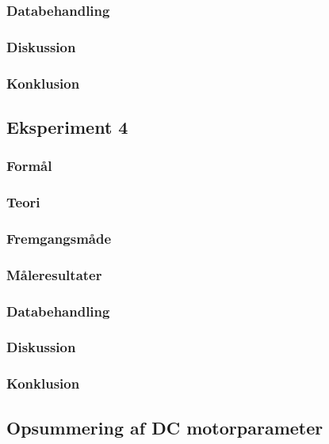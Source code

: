\subsubsection{Databehandling}
\subsubsection{Diskussion}
\subsubsection{Konklusion}


\subsection{Eksperiment 4}
\subsubsection{Formål}
\subsubsection{Teori}
\subsubsection{Fremgangsmåde}
\subsubsection{Måleresultater}
\subsubsection{Databehandling}
\subsubsection{Diskussion}
\subsubsection{Konklusion}

\subsection{Opsummering af DC motorparameter}